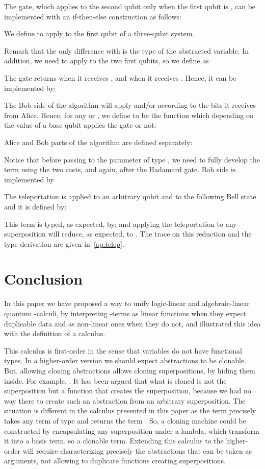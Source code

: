 \documentclass[preprint]{elsarticle}
\begin{document}
The  gate, which applies  to the second qubit only
when the first qubit is , can be implemented with an if-then-else
construction as follows:


We define  to apply  to the first qubit of a three-qubit system.


Remark that the only difference with  is the type of the abstracted
variable. In addition, we need to apply  to the two first qubits, so we
define  as


The  gate returns  when it receives , and  when it
receives . Hence, it can be implemented by:


The Bob side of the algorithm will apply  and/or  according to
the bits it receives from Alice. Hence, for any  or , we define  to be the
function which depending on the value of a base qubit  applies the 
gate or not:


Alice and Bob parts of the algorithm are defined separately:


Notice that before passing to  the parameter of type
, we need to fully develop the term using the two
casts, and again, after the Hadamard gate. Bob side is implemented by


The teleportation is applied to an arbitrary qubit and to the following Bell
state
 and it is defined by:


This term is typed, as expected, by:  and applying the teleportation to any superposition  will reduce, as expected, to . The trace on this reduction and the type derivation are
given in~\ref{ap:telep}.

\section{Conclusion}\label{sec:conclusion}

In this paper we have proposed a way to unify logic-linear and algebraic-linear
quantum -calculi, by interpreting -terms as linear functions
when they expect duplicable data and as non-linear ones when they do not, and
illustrated this idea with the definition of a calculus.

This calculus is first-order in the sense that variables do not have functional
types. In a higher-order version we should expect abstractions to be clonable.
But, allowing cloning abstractions allows cloning superpositions, by hiding them
inside. For example, . It has been argued
\cite{ArrighiDowekRTA08,ArrighiDiazcaroValironIC17} that what is cloned is not
the superposition but a function that creates the superposition, because we had
no way there to create such an abstraction from an arbitrary superposition. The
situation is different in the calculus presented in this paper as the term
 precisely takes any term  of type
 and returns the term . So, a cloning machine could be
constructed by encapsulating any superposition  under a lambda, which
transform it into a basis term, so a clonable term. Extending this calculus to
the higher-order will require characterizing precisely the abstractions that can
be taken as arguments, not allowing to duplicate functions creating
superpositions.
\end{document}
